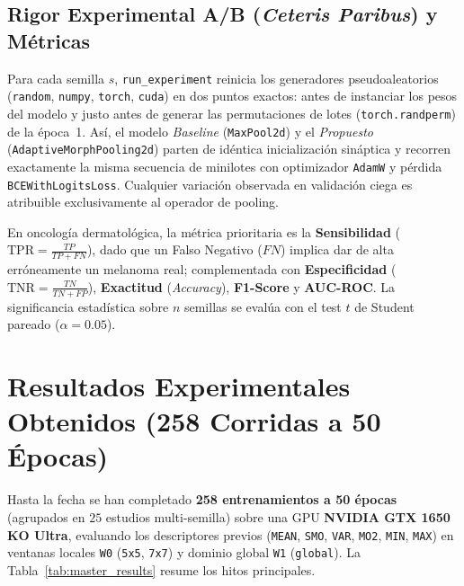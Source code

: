 \documentclass[10pt,a4paper,twocolumn]{article}
\begin{document}
\subsection{Rigor Experimental A/B (\emph{Ceteris Paribus}) y Métricas}
Para cada semilla $s$, \texttt{run\_experiment} reinicia los generadores pseudoaleatorios (\texttt{random}, \texttt{numpy}, \texttt{torch}, \texttt{cuda}) en dos puntos exactos: antes de instanciar los pesos del modelo y justo antes de generar las permutaciones de lotes (\texttt{torch.randperm}) de la época~1. Así, el modelo \emph{Baseline} (\texttt{MaxPool2d}) y el \emph{Propuesto} (\texttt{AdaptiveMorphPooling2d}) parten de idéntica inicialización sináptica y recorren exactamente la misma secuencia de minilotes con optimizador \texttt{AdamW} y pérdida \texttt{BCEWithLogitsLoss}. Cualquier variación observada en validación ciega es atribuible exclusivamente al operador de pooling.

En oncología dermatológica, la métrica prioritaria es la \textbf{Sensibilidad} ($\text{TPR} = \frac{TP}{TP+FN}$), dado que un Falso Negativo ($FN$) implica dar de alta erróneamente un melanoma real; complementada con \textbf{Especificidad} ($\text{TNR} = \frac{TN}{TN+FP}$), \textbf{Exactitud} (\emph{Accuracy}), \textbf{F1-Score} y \textbf{AUC-ROC}. La significancia estadística sobre $n$ semillas se evalúa con el test $t$ de Student pareado ($\alpha = 0.05$).

\section{Resultados Experimentales Obtenidos (258 Corridas a 50 Épocas)}

Hasta la fecha se han completado \textbf{258 entrenamientos a 50 épocas} (agrupados en $25$ estudios multi-semilla) sobre una GPU \textbf{NVIDIA GTX 1650 KO Ultra}, evaluando los descriptores previos (\texttt{MEAN}, \texttt{SMO}, \texttt{VAR}, \texttt{MO2}, \texttt{MIN}, \texttt{MAX}) en ventanas locales \texttt{W0} (\texttt{5x5}, \texttt{7x7}) y dominio global \texttt{W1} (\texttt{global}). La Tabla~\ref{tab:master_results} resume los hitos principales.
\end{document}
